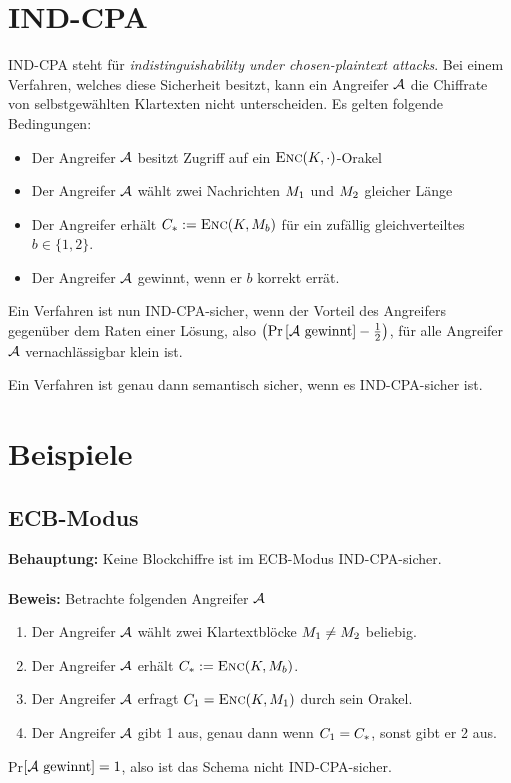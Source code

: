 \section{IND-CPA}
IND-CPA steht für \emph{indistinguishability under chosen-plaintext attacks}. Bei einem Verfahren, welches diese Sicherheit besitzt, kann ein Angreifer $\mathcal{A}$
die Chiffrate von selbstgewählten Klartexten nicht unterscheiden. Es gelten folgende Bedingungen:
\begin{itemize}
\item Der Angreifer $\mathcal{A}$ besitzt Zugriff auf ein $\textsc{Enc}(K,\cdot)$-Orakel
\item Der Angreifer $\mathcal{A}$ wählt zwei Nachrichten $M_1$ und $M_2$ gleicher Länge
\item Der Angreifer erhält $C_* := \textsc{Enc}(K, M_{b})$  für ein zufällig gleichverteiltes $b \in \{1, 2\}$.
\item Der Angreifer $\mathcal{A}$ gewinnt, wenn er $b$ korrekt errät.
\end{itemize}
Ein Verfahren ist nun IND-CPA-sicher, wenn der Vorteil des Angreifers gegenüber dem Raten einer Lösung, also $ \left( \text{Pr} \left[ \mathcal{A} \text{
gewinnt} \right] - \frac{1}{2} \right)$, für alle Angreifer $\mathcal{A}$ vernachlässigbar klein ist.
\vspace{10pt}

\begin{theorem}
Ein Verfahren ist genau dann semantisch sicher, wenn es IND-CPA-sicher ist.
\end{theorem}
\section{Beispiele}
\subsection{ECB-Modus}
\textbf{Behauptung:} Keine Blockchiffre ist im ECB-Modus IND-CPA-sicher.~\\\\
\textbf{Beweis:} Betrachte folgenden Angreifer $\mathcal{A}$
\begin{enumerate}[Schr{i}tt 1:]
    \item Der Angreifer $\mathcal{A}$ wählt zwei Klartextblöcke $M_1 \neq M_2$ beliebig.
    \item Der Angreifer $\mathcal{A}$ erhält $C_* := \textsc{Enc}(K, M_{b})$.
    \item Der Angreifer $\mathcal{A}$ erfragt $C_1 = \textsc{Enc}(K, M_1)$ durch sein Orakel.
    \item Der Angreifer $\mathcal{A}$ gibt 1 aus, genau dann wenn $C_1 = C_*$, sonst gibt er 2 aus.
\end{enumerate}
Pr$\left[ \mathcal{A} \text{ gewinnt} \right] = 1$, also ist das Schema nicht IND-CPA-sicher.

